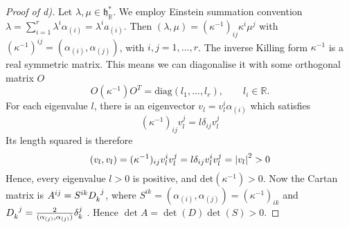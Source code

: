 \begin{proof}[Proof of d)]
  Let $\lambda, \mu \in \mathfrak{h}^*_{\mathbb{R}}$. We employ Einstein summation convention $\lambda = \sum_{i=1}^{r} \lambda^{i} \alpha_{(i)} = \lambda^{i} a_{(i)}$. Then $(\lambda, \mu) = (\kappa^{-1})_{ij} \kappa^{i} \mu^{j}$ with $(\kappa^{-1})^{ij} = (\alpha_{(i)}, \alpha_{(j)})$, with $i, j = 1, \dots, r$.
  The inverse Killing form $\kappa^{-1}$ is a real symmetric matrix. This means we can diagonalise it with some orthogonal matrix $O$
  \begin{equation}
    O (\kappa^{-1}) O^T = \text{diag}(l_1, \dots, l_r), \qquad l_i \in \mathbb{R}.
  \end{equation} 
  For each eigenvalue $l$, there is an eigenvector $v_{l} = v_{l}^{i} \alpha_{(i)}$ which satisfies
  \begin{equation}
    (\kappa^{-1})_{ij} v_{l}^{j} = l \delta_{ij} v_{l}^{j}
  \end{equation}
  Its length squared is therefore
  \begin{equation}
    (v_{l}, v_{l}) = (\kappa^{-1})_{ij} v^{i}_{l} v^{j}_{l} = l \delta_{ij} v_l^{i} v_l^{j} = \abs{v_{l}}^2 > 0
  \end{equation}
  Hence, every eigenvalue $l > 0$ is positive, and $\text{det}(\kappa^{-1}) > 0$.
  Now the Cartan matrix is $A^{ij} =  S^{ik} D\indices{_{k}^{j}}$, where $S^{ik} = (\alpha_{(i)}, \alpha_{(j)}) = (\kappa^{-1})_{ik}$ and $D\indices{_k^j} = \frac{2}{(\alpha_{(j)}, \alpha_{(j)})} \delta^{j}_{k}$ . Hence $\det A = \det (D) \det (S) > 0$.
\end{proof}
